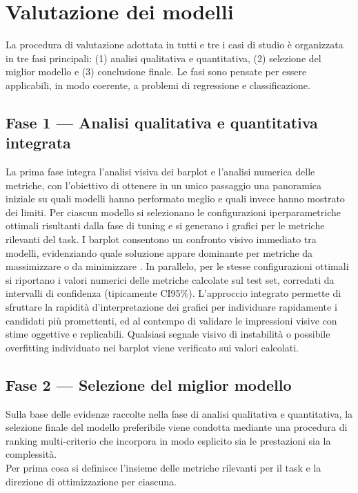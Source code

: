 \documentclass[a4paper,12pt]{report}
\begin{document}
	\section{Valutazione dei modelli}
	
	La procedura di valutazione adottata in tutti e tre i casi di studio è organizzata in tre fasi principali: (1) analisi qualitativa e quantitativa, (2) selezione del miglior modello e (3) conclusione finale. Le fasi sono pensate per essere applicabili, in modo coerente, a problemi di regressione e classificazione.
	
	\subsection{Fase 1 — Analisi qualitativa e quantitativa integrata}
	La prima fase integra l'analisi visiva dei barplot e l'analisi numerica delle metriche, con l'obiettivo di ottenere in un unico passaggio una panoramica iniziale su quali modelli hanno performato meglio e quali invece hanno mostrato dei limiti. Per ciascun modello si selezionano le configurazioni iperparametriche ottimali risultanti dalla fase di tuning e si generano i grafici per le metriche rilevanti del task. I barplot consentono un confronto visivo immediato tra modelli, evidenziando quale soluzione appare dominante per metriche da massimizzare o da minimizzare . In parallelo, per le stesse configurazioni ottimali si riportano i valori numerici delle metriche calcolate sul test set, corredati da intervalli di confidenza (tipicamente CI95\%). L'approccio integrato permette di sfruttare la rapidità d'interpretazione dei grafici per individuare rapidamente i candidati più promettenti, ed al contempo di validare le impressioni visive con stime oggettive e replicabili. Qualsiasi segnale visivo di instabilità o possibile overfitting individuato nei barplot viene verificato sui valori calcolati.
	
	\subsection{Fase 2 — Selezione del miglior modello}
	Sulla base delle evidenze raccolte nella fase di analisi qualitativa e quantitativa, la selezione finale del modello preferibile viene condotta mediante una procedura di ranking multi-criterio che incorpora in modo esplicito sia le prestazioni sia la complessità. \\
	Per prima cosa si definisce l'insieme delle metriche rilevanti per il task e la direzione di ottimizzazione per ciascuna. \\
	
\end{document}
